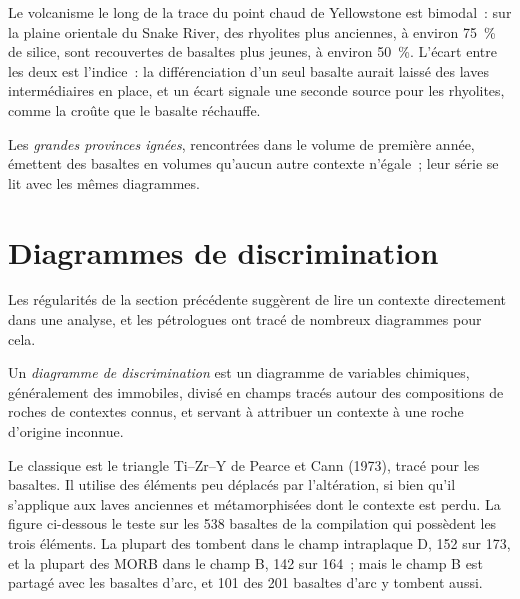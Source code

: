 Le volcanisme le long de la trace du point chaud de Yellowstone est bimodal~: sur la plaine
orientale du Snake River, des rhyolites plus anciennes, à environ \qty{75}{\percent} de silice, sont
recouvertes de basaltes plus jeunes, à environ \qty{50}{\percent}. L'écart entre les deux est l'indice~:
la différenciation d'un seul basalte aurait laissé des laves intermédiaires en place, et un écart
signale une seconde source pour les rhyolites, comme la croûte que le basalte réchauffe.

Les \emph{grandes provinces ignées}, rencontrées dans le volume de première année, émettent des basaltes en volumes
qu'aucun autre contexte n'égale~; leur série se lit avec les mêmes diagrammes.

\section{Diagrammes de discrimination}\label{sec:b2:magmatic-series:discrimination}

Les régularités de la section précédente suggèrent de lire un contexte directement dans une analyse,
et les pétrologues ont tracé de nombreux diagrammes pour cela.

\begin{definition}\label{def:b2:magmatic-series:discrimination}
Un \emph{diagramme de discrimination} est un diagramme de
variables chimiques, généralement des  immobiles, divisé en champs tracés autour des
compositions de roches de contextes connus, et servant à attribuer un contexte à une roche d'origine
inconnue.
\end{definition}

Le classique est le triangle Ti--Zr--Y de Pearce et Cann (1973), tracé pour les basaltes. Il
utilise des éléments peu déplacés par l'altération, si bien qu'il s'applique aux laves anciennes et
métamorphisées dont le contexte est perdu. La figure ci-dessous le teste sur les 538 basaltes de la
compilation qui possèdent les trois éléments. La plupart des  tombent dans le champ
intraplaque D, 152 sur 173, et la plupart des MORB dans le champ B, 142 sur 164~; mais le champ B est
partagé avec les basaltes d'arc, et 101 des 201 basaltes d'arc y tombent aussi.

